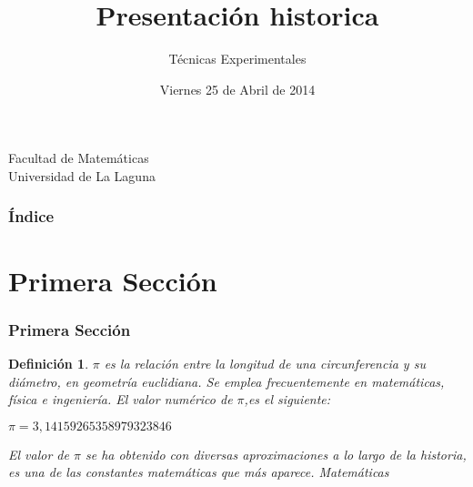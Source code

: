 \documentclass{beamer}
\title[E numero PI]{Presentación historica}
\author[Shaila Verona Rodriguez]{Técnicas Experimentales}
\date[25-04-2014]{Viernes 25 de Abril de 2014}
\newtheorem{definicion}{Definición}
\begin{document}
  
\begin{frame}

  \titlepage

  \begin{small}
    \begin{center}
     Facultad de Matemáticas \\
     Universidad de La Laguna
    \end{center}
  \end{small}

\end{frame}

\begin{frame}
  \frametitle{Índice}  
  \tableofcontents[pausesections]
\end{frame}


\section{Primera Sección}


\begin{frame}

\frametitle{Primera Sección}

\begin{definicion}
$\pi$  es la relación entre la longitud de una circunferencia y su diámetro, en geometría euclidiana. Se emplea frecuentemente en matemáticas, física e ingeniería. El valor numérico de $\pi$,es el siguiente:

     $\pi= 3,14159265358979323846$

El valor de $\pi$ se ha obtenido con diversas aproximaciones a lo largo de la historia, es una de las constantes matemáticas que más aparece. 
\alert{Matemáticas}~\cite{pi}
\end{definicion}

\end{frame}
\end{document}
